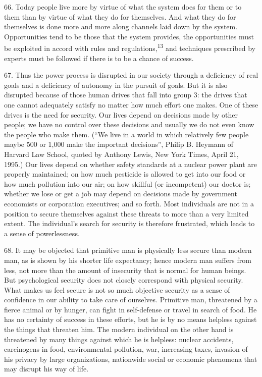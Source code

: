 \documentclass{article}
\begin{document}
66. Today people live more by virtue of what the system does for them or to them than by virtue 
of what they do for themselves. And what they do for themselves is done more and more along 
channels laid down by the system. Opportunities tend to be those that the system provides, the 
opportunities must be exploited in accord with rules and regulations,\textsuperscript{13} and techniques prescribed 
by experts must be followed if there is to be a chance of success. \vspace{\baselineskip}

67. Thus the power process is disrupted in our society through a deficiency of real goals and a 
deficiency of autonomy in the pursuit of goals. But it is also disrupted because of those human 
drives that fall into group 3: the drives that one cannot adequately satisfy no matter how much 
effort one makes. One of these drives is the need for security. Our lives depend on decisions made 
by other people; we have no control over these decisions and usually we do not even know the 
people who make them. (“We live in a world in which relatively few people maybe 500 or 
1,000 make the important decisions”, Philip B. Heymann of Harvard Law School, quoted by 
Anthony Lewis, New York Times, April 21, 1995.) Our lives depend on whether safety standards 
at a nuclear power plant are properly maintained; on how much pesticide is allowed to get into our 
food or how much pollution into our air; on how skillful (or incompetent) our doctor is; whether 
we lose or get a job may depend on decisions made by government economists or corporation 
executives; and so forth. Most individuals are not in a position to secure themselves against these 
threats to more than a very limited extent. The individual’s search for security is therefore 
frustrated, which leads to a sense of powerlessness. \vspace{\baselineskip}

68. It may be objected that primitive man is physically less secure than modern man, as is shown 
by his shorter life expectancy; hence modern man suffers from less, not more than the amount of 
insecurity that is normal for human beings. But psychological security does not closely correspond 
with physical security. What makes us feel secure is not so much objective security as a sense of 
confidence in our ability to take care of ourselves. Primitive man, threatened by a fierce animal 
or by hunger, can fight in self-defense or travel in search of food. He has no certainty of success 
in these efforts, but he is by no means helpless against the things that threaten him. The modern 
individual on the other hand is threatened by many things against which he is helpless: nuclear 
accidents, carcinogens in food, environmental pollution, war, increasing taxes, invasion of his 
privacy by large organizations, nationwide social or economic phenomena that may disrupt his 
way of life. \vspace{\baselineskip}
\end{document}
